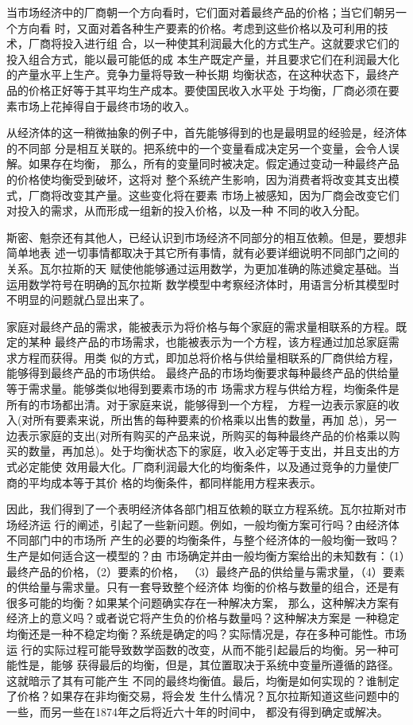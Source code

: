 当市场经济中的厂商朝一个方向看时，它们面对着最终产品的价格；当它们朝另一个方向看
时，又面对着各种生产要素的价格。考虑到这些价格以及可利用的技术，厂商将投入进行组
合，以一种使其利润最大化的方式生产。这就要求它们的投入组合方式，能以最可能低的成
本生产既定产量，并且要求它们在利润最大化的产量水平上生产。竞争力量将导致一种长期
均衡状态，在这种状态下，最终产品的价格正好等于其平均生产成本。要使国民收入水平处
于均衡，厂商必须在要素市场上花掉得自于最终市场的收入。

从经济体的这一稍微抽象的例子中，首先能够得到的也是最明显的经验是，经济体的不同部
分是相互关联的。把系统中的一个变量看成决定另一个变量，会令人误解。如果存在均衡，
那么，所有的变量同时被决定。假定通过变动一种最终产品的价格使均衡受到破坏，这将对
整个系统产生影响，因为消费者将改变其支出模式，厂商将改变其产量。这些变化将在要素
市场上被感知，因为厂商会改变它们对投入的需求，从而形成一组新的投入价格，以及一种
不同的收入分配。

斯密、魁奈还有其他人，已经认识到市场经济不同部分的相互依赖。但是，要想非简单地表
述一切事情都取决于其它所有事情，就有必要详细说明不同部门之间的关系。瓦尔拉斯的天
赋使他能够通过运用数学，为更加准确的陈述奠定基础。当运用数学符号在明确的瓦尔拉斯
数学模型中考察经济体时，用语言分析其模型时不明显的问题就凸显出来了。

家庭对最终产品的需求，能被表示为将价格与每个家庭的需求量相联系的方程。既定的某种
最终产品的市场需求，也能被表示为一个方程，该方程通过加总家庭需求方程而获得。用类
似的方式，即加总将价格与供给量相联系的厂商供给方程，能够得到最终产品的市场供给。
最终产品的市场均衡要求每种最终产品的供给量等于需求量。能够类似地得到要素市场的市
场需求方程与供给方程，均衡条件是所有的市场都出清。对于家庭来说，能够得到一个方程，
方程一边表示家庭的收入(对所有要素来说，所出售的每种要素的价格乘以出售的数量，再加
总)，另一边表示家庭的支出(对所有购买的产品来说，所购买的每种最终产品的价格乘以购
买的数量，再加总)。处于均衡状态下的家庭，收入必定等于支出，并且支出的方式必定能使
效用最大化。厂商利润最大化的均衡条件，以及通过竞争的力量使厂商的平均成本等于其价
格的均衡条件，都同样能用方程来表示。

因此，我们得到了一个表明经济体各部门相互依赖的联立方程系统。瓦尔拉斯对市场经济运
行的阐述，引起了一些新问题。例如，一般均衡方案可行吗？由经济体不同部门中的市场所
产生的必要的均衡条件，与整个经济体的一般均衡一致吗？生产是如何适合这一模型的？由
市场确定并由一般均衡方案给出的未知数有：（1）最终产品的价格，（2）要素的价格，
（3）最终产品的供给量与需求量，（4）要素的供给量与需求量。只有一套导致整个经济体
均衡的价格与数量的组合，还是有很多可能的均衡？如果某个问题确实存在一种解决方案，
那么，这种解决方案有经济上的意义吗？或者说它将产生负的价格与数量吗？这种解决方案是
一种稳定均衡还是一种不稳定均衡？系统是确定的吗？实际情况是，存在多种可能性。市场运
行的实际过程可能导致数学函数的改变，从而不能引起最后的均衡。另一种可能性是，能够
获得最后的均衡，但是，其位置取决于系统中变量所遵循的路径。这就暗示了其有可能产生
不同的最终均衡值。最后，均衡是如何实现的？谁制定了价格？如果存在非均衡交易，将会发
生什么情况？瓦尔拉斯知道这些问题中的一些，而另一些在1874年之后将近六十年的时间中，
都没有得到确定或解决。

